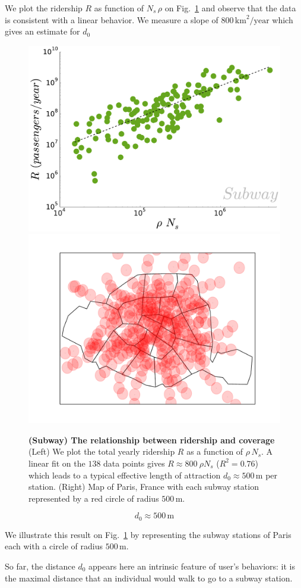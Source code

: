  We plot the ridership $R$ as function of $N_s\,\rho$ on
 Fig.~\ref{fig:metro_ridership} and observe that the data is consistent with a
 linear behavior. We measure a slope of $800\, \text{km}^2/\text{year}$ which
 gives an estimate for $d_0$

\begin{figure}
\centering
    \includegraphics[width=.49\textwidth]{gfx/chapter-networks/metro_ridership_coverage.pdf}
    \includegraphics[width=.49\textwidth]{gfx/chapter-networks/paris_coverage.pdf}
    \caption{{\bf (Subway) The relationship between ridership and coverage} (Left)
    We plot the total yearly ridership $R$ as a function of $\rho\,N_s$. A linear
    fit on the $138$ data points gives $R \approx 800\:\rho N_s$ ($R^2=0.76$) which
    leads to a typical effective length of attraction $d_0 \approx 500\,\text{m}$
    per station. (Right) Map of Paris, France with each subway station represented
    by a red circle of radius $500\,\text{m}$.\label{fig:metro_ridership}}
\end{figure}

\begin{equation}
    d_0 \approx 500\,\text{m}
\end{equation}

We illustrate this result on Fig.~\ref{fig:metro_ridership} by representing the
subway stations of Paris each with a circle of radius $500\,\text{m}$. 

So far, the distance $d_0$ appears here an intrinsic feature of user's
behaviors: it is the maximal distance that an individual would walk to go to a
subway station.

